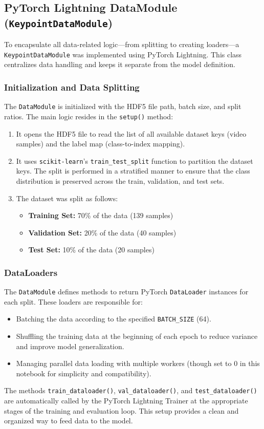 \documentclass[11pt, a4paper]{article}
\begin{document}
\subsection{PyTorch Lightning DataModule (\texttt{KeypointDataModule})}
To encapsulate all data-related logic—from splitting to creating loaders—a \texttt{KeypointDataModule} was implemented using PyTorch Lightning. This class centralizes data handling and keeps it separate from the model definition.

\subsubsection{Initialization and Data Splitting}
The \texttt{DataModule} is initialized with the HDF5 file path, batch size, and split ratios. The main logic resides in the \texttt{setup()} method:
\begin{enumerate}
    \item It opens the HDF5 file to read the list of all available dataset keys (video samples) and the label map (class-to-index mapping).
    \item It uses \texttt{scikit-learn}'s \texttt{train\_test\_split} function to partition the dataset keys. The split is performed in a stratified manner to ensure that the class distribution is preserved across the train, validation, and test sets.
    \item The dataset was split as follows:
        \begin{itemize}
            \item \textbf{Training Set:} 70\% of the data (139 samples)
            \item \textbf{Validation Set:} 20\% of the data (40 samples)
            \item \textbf{Test Set:} 10\% of the data (20 samples)
        \end{itemize}
\end{enumerate}

\subsubsection{DataLoaders}
The \texttt{DataModule} defines methods to return PyTorch \texttt{DataLoader} instances for each split. These loaders are responsible for:
\begin{itemize}
    \item Batching the data according to the specified \texttt{BATCH\_SIZE} (64).
    \item Shuffling the training data at the beginning of each epoch to reduce variance and improve model generalization.
    \item Managing parallel data loading with multiple workers (though set to 0 in this notebook for simplicity and compatibility).
\end{itemize}
The methods \texttt{train\_dataloader()}, \texttt{val\_dataloader()}, and \texttt{test\_dataloader()} are automatically called by the PyTorch Lightning Trainer at the appropriate stages of the training and evaluation loop. This setup provides a clean and organized way to feed data to the model.
\end{document}
